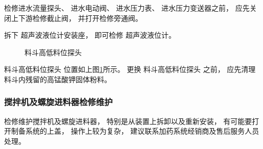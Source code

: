 \documentclass[UTF8,a4paper,12pt,titlepage]{ctexart}
\begin{document}
            \par 检修进水流量探头、
            进水电动阀、
            进水压力表、
            进水压力变送器之前，
            应先关闭上下游检修截止阀，
            并打开检修旁通阀。
            \par 拆下
            超声波液位计安装座， 
            即可检修
            超声波液位计。

            \begin{figure}[h]
                \centering
                \caption{料斗高低料位探头}\label{fig:g18}
            \end{figure}

            \par 料斗高低料位探头
            位置如上图\ref{fig:g18}所示。
            更换
            料斗高低料位探头
            之前，
            应先清理料斗内残留的高锰酸钾固体粉料。

            \newpage
        
        \subsubsection{搅拌机及螺旋进料器检修维护}
            检修维护搅拌机及螺旋进料器，
            特别是从装置上拆卸以及重新安装，
            有可能要打开制备系统的上盖，
            操作上较为复杂，
            建议联系加药系统经销商及售后服务人员处理。
\end{document}
